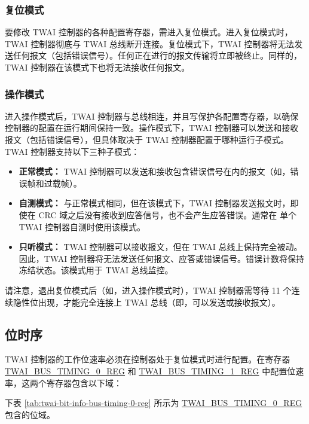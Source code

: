 \documentclass[main\_\_CN.tex]{subfiles}
\begin{document}
\subsubsection{复位模式}
要修改 TWAI 控制器的各种配置寄存器，需进入复位模式。进入复位模式时，TWAI 控制器彻底与 TWAI 总线断开连接。复位模式下，TWAI 控制器将无法发送任何报文（包括错误信号）。任何正在进行的报文传输将立即被终止。同样的，TWAI 控制器在该模式下也将无法接收任何报文。

\subsubsection{操作模式}
进入操作模式后，TWAI 控制器与总线相连，并且写保护各配置寄存器，以确保控制器的配置在运行期间保持一致。操作模式下，TWAI 控制器可以发送和接收报文（包括错误信号），但具体取决于 TWAI 控制器配置于哪种运行子模式。TWAI 控制器支持以下三种子模式：

\begin{itemize}
    \item {\bfseries 正常模式：} TWAI 控制器可以发送和接收包含错误信号在内的报文（如，错误帧和过载帧）。
    \item {\bfseries 自测模式：} 与正常模式相同，但在该模式下，TWAI 控制器发送报文时，即使在 CRC 域之后没有接收到应答信号，也不会产生应答错误。通常在 单个 TWAI 控制器自测时使用该模式。
    \item {\bfseries 只听模式：} TWAI 控制器可以接收报文，但在 TWAI 总线上保持完全被动。因此，TWAI 控制器将无法发送任何报文、应答或错误信号。错误计数将保持冻结状态。该模式用于 TWAI 总线监控。
\end{itemize}

请注意，退出复位模式后（如，进入操作模式时），TWAI 控制器需等待 11 个连续隐性位出现，才能完全连接上 TWAI 总线（即，可以发送或接收报文）。

\subsection{位时序}
TWAI 控制器的工作位速率必须在控制器处于复位模式时进行配置。在寄存器 \\\hyperref[regdesc:TWAIBUSTIMING0REG]{TWAI\_BUS\_TIMING\_0\_REG} 和 \hyperref[regdesc:TWAIBUSTIMING1REG]{TWAI\_BUS\_TIMING\_1\_REG} 中配置位速率，这两个寄存器包含以下域：

下表 \ref{tab:twai-bit-info-bus-timing-0-reg} 所示为 \hyperref[regdesc:TWAIBUSTIMING0REG]{TWAI\_BUS\_TIMING\_0\_REG} 包含的位域。
\end{document}
